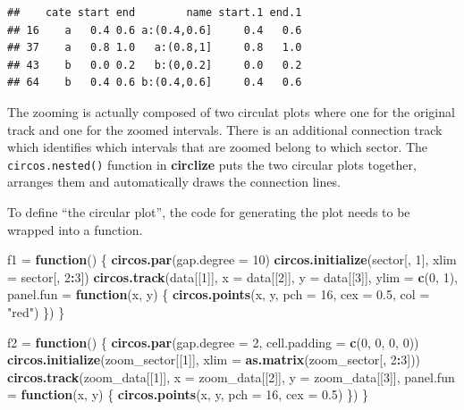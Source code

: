 \documentclass[]{book}
\newenvironment{Shaded}{\begin{snugshade}}{\end{snugshade}}
\newcommand{\KeywordTok}[1]{\textcolor[rgb]{0.13,0.29,0.53}{\textbf{#1}}}
\newcommand{\DataTypeTok}[1]{\textcolor[rgb]{0.13,0.29,0.53}{#1}}
\newcommand{\DecValTok}[1]{\textcolor[rgb]{0.00,0.00,0.81}{#1}}
\newcommand{\FloatTok}[1]{\textcolor[rgb]{0.00,0.00,0.81}{#1}}
\newcommand{\StringTok}[1]{\textcolor[rgb]{0.31,0.60,0.02}{#1}}
\newcommand{\ControlFlowTok}[1]{\textcolor[rgb]{0.13,0.29,0.53}{\textbf{#1}}}
\newcommand{\OperatorTok}[1]{\textcolor[rgb]{0.81,0.36,0.00}{\textbf{#1}}}
\newcommand{\NormalTok}[1]{#1}
\theoremstyle{definition}
\theoremstyle{definition}
\theoremstyle{remark}
\begin{document}
\begin{verbatim}
##    cate start end        name start.1 end.1
## 16    a   0.4 0.6 a:(0.4,0.6]     0.4   0.6
## 37    a   0.8 1.0   a:(0.8,1]     0.8   1.0
## 43    b   0.0 0.2   b:(0,0.2]     0.0   0.2
## 64    b   0.4 0.6 b:(0.4,0.6]     0.4   0.6
\end{verbatim}

The zooming is actually composed of two circulat plots where one for the
original track and one for the zoomed intervals. There is an additional
connection track which identifies which intervals that are zoomed belong
to which sector. The \texttt{circos.nested()} function in
\textbf{circlize} puts the two circular plots together, arranges them
and automatically draws the connection lines.

To define ``the circular plot'', the code for generating the plot needs
to be wrapped into a function.

\begin{Shaded}
\begin{Highlighting}[]
\NormalTok{f1 =}\StringTok{ }\ControlFlowTok{function}\NormalTok{() \{}
    \KeywordTok{circos.par}\NormalTok{(}\DataTypeTok{gap.degree =} \DecValTok{10}\NormalTok{)}
    \KeywordTok{circos.initialize}\NormalTok{(sector[, }\DecValTok{1}\NormalTok{], }\DataTypeTok{xlim =}\NormalTok{ sector[, }\DecValTok{2}\OperatorTok{:}\DecValTok{3}\NormalTok{])}
    \KeywordTok{circos.track}\NormalTok{(data[[}\DecValTok{1}\NormalTok{]], }\DataTypeTok{x =}\NormalTok{ data[[}\DecValTok{2}\NormalTok{]], }\DataTypeTok{y =}\NormalTok{ data[[}\DecValTok{3}\NormalTok{]], }\DataTypeTok{ylim =} \KeywordTok{c}\NormalTok{(}\DecValTok{0}\NormalTok{, }\DecValTok{1}\NormalTok{), }
        \DataTypeTok{panel.fun =} \ControlFlowTok{function}\NormalTok{(x, y) \{}
            \KeywordTok{circos.points}\NormalTok{(x, y, }\DataTypeTok{pch =} \DecValTok{16}\NormalTok{, }\DataTypeTok{cex =} \FloatTok{0.5}\NormalTok{, }\DataTypeTok{col =} \StringTok{"red"}\NormalTok{)}
\NormalTok{    \})}
\NormalTok{\}}

\NormalTok{f2 =}\StringTok{ }\ControlFlowTok{function}\NormalTok{() \{}
    \KeywordTok{circos.par}\NormalTok{(}\DataTypeTok{gap.degree =} \DecValTok{2}\NormalTok{, }\DataTypeTok{cell.padding =} \KeywordTok{c}\NormalTok{(}\DecValTok{0}\NormalTok{, }\DecValTok{0}\NormalTok{, }\DecValTok{0}\NormalTok{, }\DecValTok{0}\NormalTok{))}
    \KeywordTok{circos.initialize}\NormalTok{(zoom_sector[[}\DecValTok{1}\NormalTok{]], }\DataTypeTok{xlim =} \KeywordTok{as.matrix}\NormalTok{(zoom_sector[, }\DecValTok{2}\OperatorTok{:}\DecValTok{3}\NormalTok{]))}
    \KeywordTok{circos.track}\NormalTok{(zoom_data[[}\DecValTok{1}\NormalTok{]], }\DataTypeTok{x =}\NormalTok{ zoom_data[[}\DecValTok{2}\NormalTok{]], }\DataTypeTok{y =}\NormalTok{ zoom_data[[}\DecValTok{3}\NormalTok{]], }
        \DataTypeTok{panel.fun =} \ControlFlowTok{function}\NormalTok{(x, y) \{}
            \KeywordTok{circos.points}\NormalTok{(x, y, }\DataTypeTok{pch =} \DecValTok{16}\NormalTok{, }\DataTypeTok{cex =} \FloatTok{0.5}\NormalTok{)}
\NormalTok{        \})}
\NormalTok{\}}
\end{Highlighting}
\end{Shaded}
\end{document}

